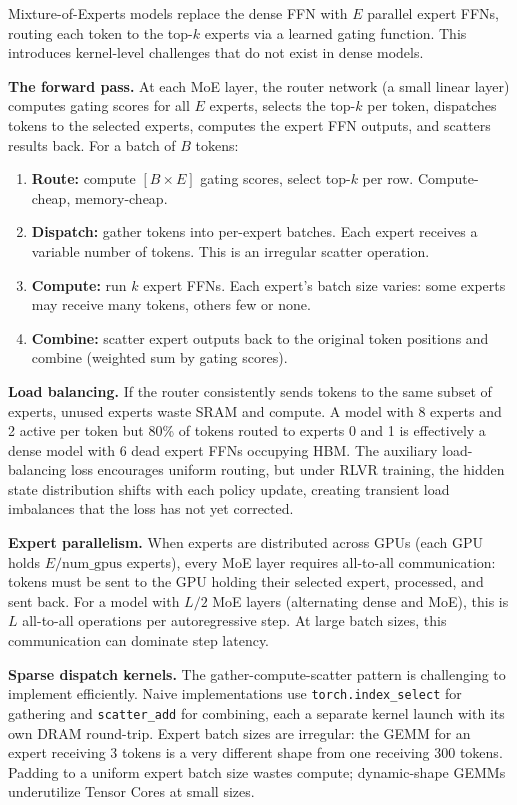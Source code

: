 Mixture-of-Experts models replace the dense FFN with $E$ parallel expert FFNs, routing each token to the top-$k$ experts via a learned gating function. This introduces kernel-level challenges that do not exist in dense models.

\textbf{The forward pass.} At each MoE layer, the router network (a small linear layer) computes gating scores for all $E$ experts, selects the top-$k$ per token, dispatches tokens to the selected experts, computes the expert FFN outputs, and scatters results back. For a batch of $B$ tokens:

\begin{enumerate}
  \item \textbf{Route:} compute $[B \times E]$ gating scores, select top-$k$ per row. Compute-cheap, memory-cheap.
  \item \textbf{Dispatch:} gather tokens into per-expert batches. Each expert receives a variable number of tokens. This is an irregular scatter operation.
  \item \textbf{Compute:} run $k$ expert FFNs. Each expert's batch size varies: some experts may receive many tokens, others few or none.
  \item \textbf{Combine:} scatter expert outputs back to the original token positions and combine (weighted sum by gating scores).
\end{enumerate}

\textbf{Load balancing.} If the router consistently sends tokens to the same subset of experts, unused experts waste SRAM and compute. A model with 8 experts and 2 active per token but 80\% of tokens routed to experts 0 and 1 is effectively a dense model with 6 dead expert FFNs occupying HBM. The auxiliary load-balancing loss encourages uniform routing, but under RLVR training, the hidden state distribution shifts with each policy update, creating transient load imbalances that the loss has not yet corrected.

\textbf{Expert parallelism.} When experts are distributed across GPUs (each GPU holds $E / \text{num\_gpus}$ experts), every MoE layer requires all-to-all communication: tokens must be sent to the GPU holding their selected expert, processed, and sent back. For a model with $L/2$ MoE layers (alternating dense and MoE), this is $L$ all-to-all operations per autoregressive step. At large batch sizes, this communication can dominate step latency.

\textbf{Sparse dispatch kernels.} The gather-compute-scatter pattern is challenging to implement efficiently. Naive implementations use \texttt{torch.index\_select} for gathering and \texttt{scatter\_add} for combining, each a separate kernel launch with its own DRAM round-trip. Expert batch sizes are irregular: the GEMM for an expert receiving 3 tokens is a very different shape from one receiving 300 tokens. Padding to a uniform expert batch size wastes compute; dynamic-shape GEMMs underutilize Tensor Cores at small sizes.

